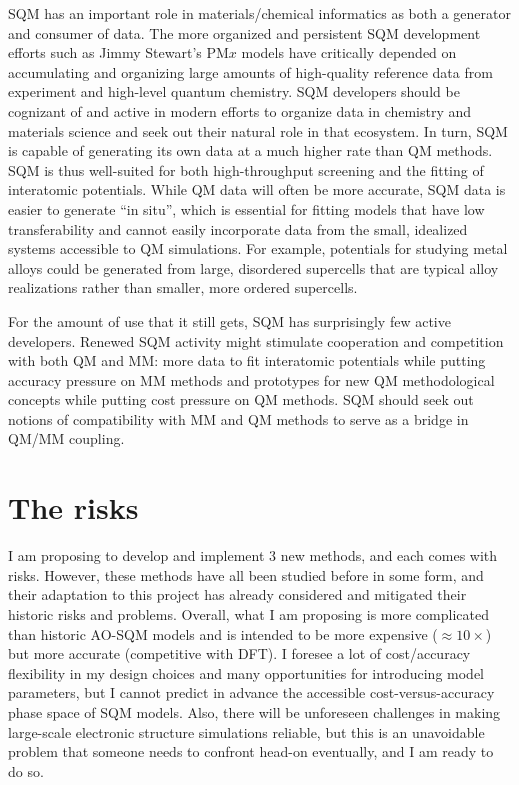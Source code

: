 \documentclass[12pt]{article}
\begin{document}
SQM has an important role in materials/chemical informatics as both a generator and consumer of data.
The more organized and persistent SQM development efforts such as Jimmy Stewart's PM$x$ models
 have critically depended on accumulating and organizing large amounts of high-quality reference data from experiment and high-level quantum chemistry.
SQM developers should be cognizant of and active in modern efforts to organize data in chemistry and materials science
 and seek out their natural role in that ecosystem.
In turn, SQM is capable of generating its own data at a much higher rate than QM methods.
SQM is thus well-suited for both high-throughput screening and the fitting of interatomic potentials.
While QM data will often be more accurate, SQM data is easier to generate ``in situ'', which is essential for fitting models that have low transferability
 and cannot easily incorporate data from the small, idealized systems accessible to QM simulations.
For example, potentials for studying metal alloys could be generated from large, disordered supercells
 that are typical alloy realizations rather than smaller, more ordered supercells.

For the amount of use that it still gets, SQM has surprisingly few active developers.
Renewed SQM activity might stimulate cooperation and competition with both QM and MM:
 more data to fit interatomic potentials while putting accuracy pressure on MM methods and
 prototypes for new QM methodological concepts while putting cost pressure on QM methods.
SQM should seek out notions of compatibility with MM and QM methods to serve as a bridge in QM/MM coupling.

\section{The risks}

I am proposing to develop and implement 3 new methods, and each comes with risks.
However, these methods have all been studied before in some form,
 and their adaptation to this project has already considered and mitigated their historic risks and problems.
Overall, what I am proposing is more complicated than historic AO-SQM models
 and is intended to be more expensive ($\approx 10\times$) but more accurate (competitive with DFT).
I foresee a lot of cost/accuracy flexibility in my design choices and many opportunities for introducing model parameters,
 but I cannot predict in advance the accessible cost-versus-accuracy phase space of SQM models.
Also, there will be unforeseen challenges in making large-scale electronic structure simulations reliable,
 but this is an unavoidable problem that someone needs to confront head-on eventually, and I am ready to do so.
\end{document}
